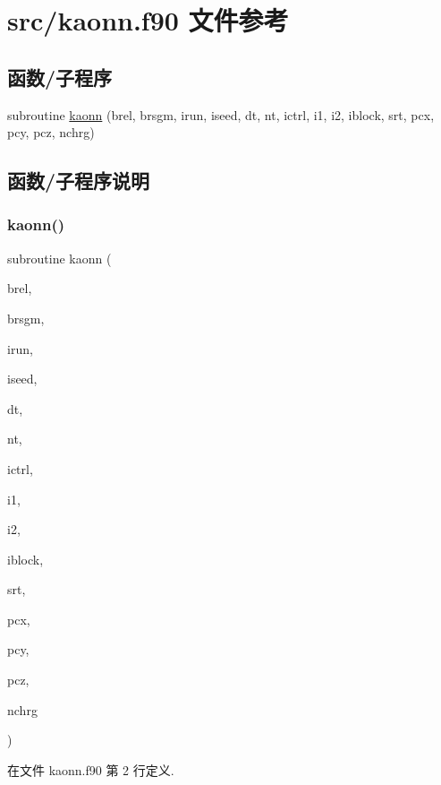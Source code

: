 \hypertarget{kaonn_8f90}{}\section{src/kaonn.f90 文件参考}
\label{kaonn_8f90}
\subsection*{函数/子程序}
\begin{DoxyCompactItemize}
\item 
subroutine \mbox{\hyperlink{kaonn_8f90_ab2d6fb788f53b5186414211218640cfd}{kaonn}} (brel, brsgm, irun, iseed, dt, nt, ictrl, i1, i2, iblock, srt, pcx, pcy, pcz, nchrg)
\end{DoxyCompactItemize}


\subsection{函数/子程序说明}
\mbox{\label{kaonn_8f90_ab2d6fb788f53b5186414211218640cfd}} 
\subsubsection{\texorpdfstring{kaonn()}{kaonn()}}
{\footnotesize\ttfamily subroutine kaonn (\begin{DoxyParamCaption}\item[{}]{brel,  }\item[{}]{brsgm,  }\item[{}]{irun,  }\item[{}]{iseed,  }\item[{}]{dt,  }\item[{}]{nt,  }\item[{}]{ictrl,  }\item[{}]{i1,  }\item[{}]{i2,  }\item[{}]{iblock,  }\item[{}]{srt,  }\item[{}]{pcx,  }\item[{}]{pcy,  }\item[{}]{pcz,  }\item[{}]{nchrg }\end{DoxyParamCaption})}



在文件 kaonn.\+f90 第 2 行定义.

